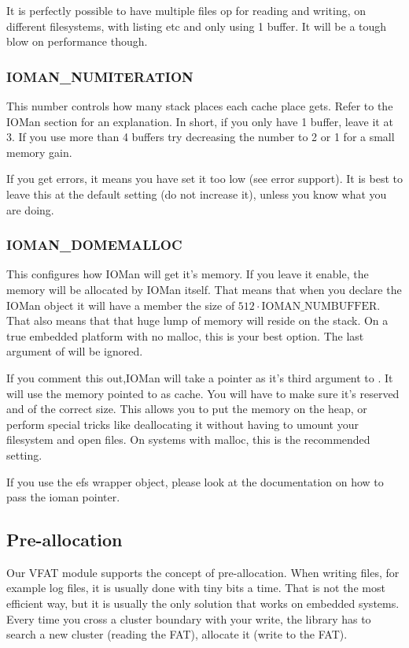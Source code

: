It is perfectly possible to have multiple files op for reading and writing, on different
filesystems, with listing etc and only using 1 buffer. It will be a tough blow on
performance though.
\subsubsection*{IOMAN\_NUMITERATION}
This number controls how many stack places each cache place gets. Refer to the IOMan
section for an explanation. In short, if you only have 1 buffer, leave it at 3. If you
use more than 4 buffers try decreasing the number to 2 or 1 for a small memory gain.

If you get errors, it means you have set it too low (see error support). It is best
to leave this at the default setting (do not increase it), unless you know what you
are doing.
\subsubsection*{IOMAN\_DOMEMALLOC}
This configures how IOMan will get it's memory. If you leave it enable, the memory
will be allocated by IOMan itself. That means that when you declare the IOMan object
it will have a member the size of $512 \cdot \mathrm{IOMAN\_NUMBUFFER}$.
That also means that that huge lump of memory will reside on the stack. On a true embedded platform with no malloc, this is your best option.
The last argument of  will be ignored.

If you comment this out,IOMan will take a  pointer as it's third
argument to . It will use the memory pointed to as cache.
You will have to make sure it's reserved and of the correct size.
This allows you to put the memory on the heap, or perform special tricks like
deallocating it without having to umount your filesystem and open files.
On systems with malloc, this is the recommended setting.

If you use the efs wrapper object, please look at the  documentation
on how to pass the ioman pointer.

\subsection{Pre-allocation}
Our VFAT module supports the concept of pre-allocation. When writing files, for
example log files, it is usually done with tiny bits a time. That is not the
most efficient way, but it is usually the only solution that works on embedded
systems. Every time you cross a cluster boundary with your write, the library
has to search a new cluster (reading the FAT), allocate it (write to the FAT).

